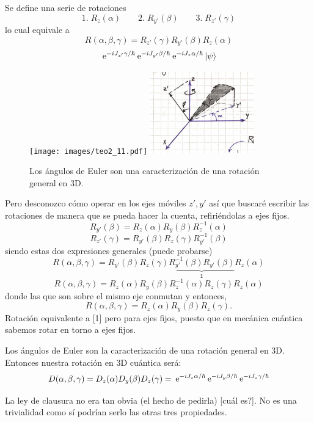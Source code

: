 \documentclass[10pt,oneside]{CBFT_book}
\begin{document}
Se define una serie de rotaciones 
\[
	1.\; R_{z}(\alpha) \qquad 2.\; R_{y'}(\beta)\qquad 3.\; R_{z'}(\gamma)
\]
lo cual equivale a
\[
	R(\alpha,\beta,\gamma) = R_{z'}(\gamma) R_{y'}(\beta) R_{z}(\alpha)
\]
\[
	\:\mathrm{e}^{-i J_{z'}\gamma/\hbar} \:\mathrm{e}^{-i J_{y'}\beta/\hbar}  \:\mathrm{e}^{-i J_z\alpha/\hbar} 
	\Ket{\psi}
\]
\begin{figure}[!htb]
	\begin{center}
	\texttt{[image: images/teo2\_11.pdf]}
	\includegraphics[width=0.4\textwidth]{images/fig_ft2_convencion_euler_angles.jpg}
	\end{center}
	\caption{Los ángulos de Euler son una caracterización de una rotación general en 3D.}
\end{figure} 
Pero desconozco cómo operar en los ejes móviles $z',y'$ así que buscaré escribir las rotaciones 
de manera que se pueda hacer la cuenta, refiriéndolas a ejes fijos.
\[
	R_{y'}(\beta) = R_{z}(\alpha) R_{y}(\beta) R_{z}^{-1}(\alpha) 
\]
\[
	R_{z'}(\gamma) = R_{y'}(\beta) R_{z}(\gamma) R_{y'}^{-1}(\beta) 
\]
siendo estas dos expresiones generales (puede probarse)
\[
	R(\alpha,\beta,\gamma) =
	R_{y'}(\beta) R_{z}(\gamma) \underbrace{R_{y'}^{-1}(\beta)R_{y'}(\beta)}_{\mathbb{1}}R_{z}(\alpha) 
\]
\[
	R(\alpha,\beta,\gamma) =
	R_{z}(\alpha) R_{y}(\beta) R_{z}^{-1}(\alpha) R_{z}(\gamma) R_{z}(\alpha)  
\]
donde las que son sobre el mismo eje conmutan y entonces,
\[
	R(\alpha,\beta,\gamma) = R_{z}(\alpha) R_{y}(\beta) R_{z}(\gamma).
\]
Rotación equivalente a [1] pero para ejes fijos, puesto que en mecánica cuántica sabemos rotar en torno a 
ejes fijos.

Los ángulos de Euler son la caracterización de una rotación general en 3D.
Entonces nuestra rotación en 3D cuántica será:
\[
	D(\alpha,\beta,\gamma) = D_z(\alpha) D_y(\beta) D_z(\gamma)  =
	\:\mathrm{e}^{-i J_z\alpha/\hbar} \:\mathrm{e}^{-i J_y\beta/\hbar} \:\mathrm{e}^{-i J_z\gamma/\hbar}
\]

La ley de clausura no era tan obvia (el hecho de pedirla) [cuál es?].
No es una trivialidad como sí podrían serlo las otras tres propiedades.
\end{document}
